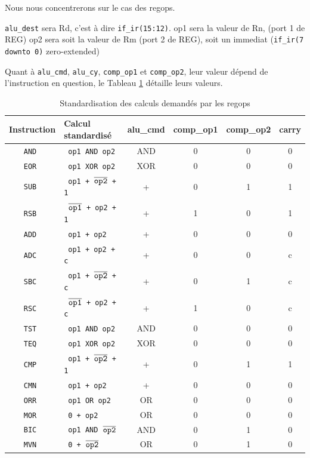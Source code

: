 \documentclass{article}
\begin{document}
Nous nous concentrerons sur le cas des regops.

\texttt{alu\_dest} sera Rd, c'est à dire \texttt{if\_ir(15:12)}.
op1 sera la valeur de Rn, (port 1 de REG)
op2 sera soit la valeur de Rm (port 2 de REG), soit un immediat (\texttt{if\_ir(7 downto 0)} zero-extended)

Quant à \texttt{alu\_cmd}, \texttt{alu\_cy}, \texttt{comp\_op1} et \texttt{comp\_op2},
leur valeur dépend de l'instruction en question,
le Tableau \ref{regops-exe} détaille leurs valeurs.

\begin{table}[H]
\centering
\begingroup
\setlength{\tabcolsep}{5pt}
\renewcommand{\arraystretch}{1.1}
\begin{tabular}{ | c | l | c | c | c | c | }
\hline
Instruction & Calcul standardisé  & alu\_cmd & comp\_op1 & comp\_op2 & carry \\
\hline
\tt{AND}    &  \tt{ op1 AND op2 } &                             AND & 0 & 0 & 0 \\
\hline
\tt{EOR}    &  \tt{ op1 XOR op2 } &                             XOR & 0 & 0 & 0 \\
\hline
\tt{SUB}    &  \tt{ op1 + $\overline{\tt{op2}}$ + 1 } &           + & 0 & 1 & 1 \\
\hline
\tt{RSB}    &  \tt{ $\overline{\tt{op1}}$ + op2 + 1} &            + & 1 & 0 & 1 \\
\hline
\tt{ADD}    &  \tt{ op1 + op2 } &                                 + & 0 & 0 & 0 \\
\hline
\tt{ADC}    &  \tt{ op1 + op2 + c} &                              + & 0 & 0 & c \\
\hline
\tt{SBC}    &  \tt{ op1 + $\overline{\tt{op2}}$ + c} &            + & 0 & 1 & c \\
\hline
\tt{RSC}    &  \tt{ $\overline{\tt{op1}}$ + op2 + c} &            + & 1 & 0 & c \\
\hline
\tt{TST}    &  \tt{ op1 AND op2 } &                             AND & 0 & 0 & 0 \\
\hline
\tt{TEQ}    &  \tt{ op1 XOR op2 } &                             XOR & 0 & 0 & 0 \\
\hline
\tt{CMP}    &  \tt{ op1 + $\overline{\tt{op2}}$ + 1 } &           + & 0 & 1 & 1 \\
\hline
\tt{CMN}    &  \tt{ op1 + op2 } &                                 + & 0 & 0 & 0 \\
\hline
\tt{ORR}    &  \tt{ op1 OR op2 } &                               OR & 0 & 0 & 0 \\
\hline
\tt{MOR}    &  \tt{ 0 + op2 } &                                  OR & 0 & 0 & 0 \\
\hline
\tt{BIC}    &  \tt{ op1 AND $\overline{\tt{op2}}$ } &           AND & 0 & 1 & 0 \\
\hline
\tt{MVN}    &  \tt{ 0 + $\overline{\tt{op2}}$ } &                OR & 0 & 1 & 0 \\
\hline
\end{tabular}
\endgroup
\caption{Standardisation des calculs demandés par les regops}
\label{regops-exe}
\end{table}
\end{document}
